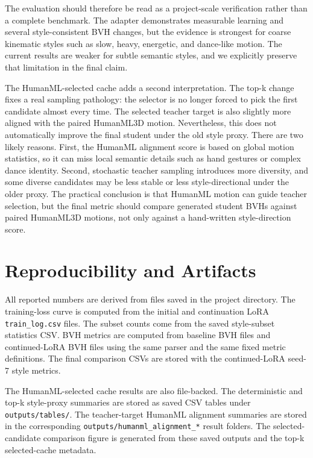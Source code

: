 \documentclass[conference]{IEEEtran}
\begin{document}
The evaluation should therefore be read as a project-scale verification rather than a complete benchmark. The adapter demonstrates measurable learning and several style-consistent BVH changes, but the evidence is strongest for coarse kinematic styles such as slow, heavy, energetic, and dance-like motion. The current results are weaker for subtle semantic styles, and we explicitly preserve that limitation in the final claim.

The HumanML-selected cache adds a second interpretation. The top-k change fixes a real sampling pathology: the selector is no longer forced to pick the first candidate almost every time. The selected teacher target is also slightly more aligned with the paired HumanML3D motion. Nevertheless, this does not automatically improve the final student under the old style proxy. There are two likely reasons. First, the HumanML alignment score is based on global motion statistics, so it can miss local semantic details such as hand gestures or complex dance identity. Second, stochastic teacher sampling introduces more diversity, and some diverse candidates may be less stable or less style-directional under the older proxy. The practical conclusion is that HumanML motion can guide teacher selection, but the final metric should compare generated student BVHs against paired HumanML3D motions, not only against a hand-written style-direction score.

\section{Reproducibility and Artifacts}
All reported numbers are derived from files saved in the project directory. The training-loss curve is computed from the initial and continuation LoRA \texttt{train\_log.csv} files. The subset counts come from the saved style-subset statistics CSV. BVH metrics are computed from baseline BVH files and continued-LoRA BVH files using the same parser and the same fixed metric definitions. The final comparison CSVs are stored with the continued-LoRA seed-7 style metrics.

The HumanML-selected cache results are also file-backed. The deterministic and top-k style-proxy summaries are stored as saved CSV tables under \texttt{outputs/tables/}. The teacher-target HumanML alignment summaries are stored in the corresponding \texttt{outputs/humanml\_alignment\_*} result folders. The selected-candidate comparison figure is generated from these saved outputs and the top-k selected-cache metadata.
\end{document}
